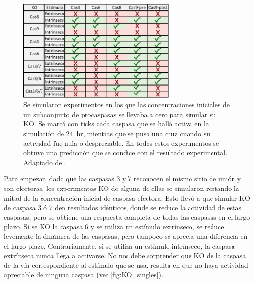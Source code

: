 \begin{figure}
    \centering
    \includegraphics[width=0.7\textwidth]{img/cap_4/ko_table.pdf}
    \caption{\footnotesize{Se simularon experimentos en los que las concentraciones iniciales de un subconjunto de procaspasas se llevaba a cero para simular su KO. Se marcó con ticks cada caspasa que se halló activa en la simulación de 24~hr, mientras que se puso una cruz cuando su actividad fue nula o despreciable. En todos estos experimentos se obtuvo una predicción que se condice con el resultado experimental. Adaptado de \cite{Corbat2021}.}}
    \label{fig:KOCaspasas}
\end{figure}

Para empezar, dado que las caspasas 3 y 7 reconocen el mismo sitio de unión y son efectoras, los experimentos KO de alguna de ellas se simularon restando la mitad de la concentración inicial de caspasa efectora. Esto llevó a que simular KO de caspasa 3 ó 7 den resultados idénticos, donde se reduce la actividad de estas caspasas, pero se obtiene una respuesta completa de todas las caspasas en el largo plazo. Si se KO la caspasa 6 y se utiliza un estímulo extrínseco, se reduce levemente la dinámica de las caspasas, pero tampoco se aprecia una diferencia en el largo plazo. Contrariamente, si se utiliza un estímulo intrínseco, la caspasa extrínseca nunca llega a activarse. No nos debe sorprender que KO de la caspasa de la vía correspondiente al estímulo que se usa, resulta en que no haya actividad apreciable de ninguna caspasa (ver \cref{fig:KO_singles}).

